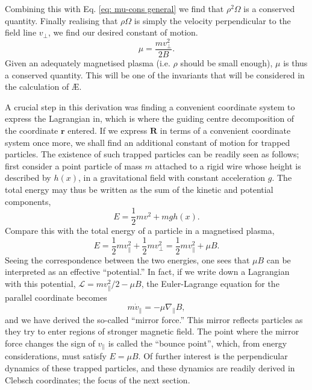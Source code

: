 Combining this with Eq. \eqref{eq: mu-cons general} we find that $\rho^2 \Omega$ is a conserved quantity. Finally realising that $\rho \Omega$ is simply the velocity perpendicular to the field line $v_\perp$, we find our desired constant of motion.
\begin{equation}
    \mu = \frac{m v_\perp^2}{2B}.
\end{equation}
Given an adequately magnetised plasma (i.e. $\rho$ should be small enough), $\mu$ is thus a conserved quantity. This will be one of the invariants that will be considered in the calculation of \AE{}. \par 
A crucial step in this derivation was finding a convenient coordinate system to express the Lagrangian in, which is where the guiding centre decomposition of the coordinate $\boldsymbol{r}$ entered. If we express $\boldsymbol{R}$ in terms of a convenient coordinate system once more, we shall find an additional constant of motion for trapped particles. The existence of such trapped particles can be readily seen as follows; first consider a point particle of mass $m$ attached to a rigid wire whose height is described by $h(x)$, in a gravitational field with constant acceleration $g$. The total energy may thus be written as the sum of the kinetic and potential components,
\begin{equation}
    E = \frac{1}{2}mv^2 + mgh(x).
\end{equation}
Compare this with the total energy of a particle in a magnetised plasma,
\begin{equation}
    E = \frac{1}{2}mv_\parallel^2 + \frac{1}{2}mv_\perp^2 = \frac{1}{2}mv_\parallel^2 + \mu B.
\end{equation}
Seeing the correspondence between the two energies, one sees that $\mu B$ can be interpreted as an effective ``potential.'' In fact, if we write down a Lagrangian with this potential, $\mathcal{L} = mv_\parallel^2/2 - \mu B$, the Euler-Lagrange equation for the parallel coordinate becomes
\begin{equation}
    m \dot{v}_\parallel = - \mu \nabla_\parallel B,
\end{equation}
and we have derived the so-called ``mirror force.'' This mirror reflects particles as they try to enter regions of stronger magnetic field. The point where the mirror force changes the sign of $v_\parallel$ is called the ``bounce point'', which, from energy considerations, must satisfy $E = \mu B$. Of further interest is the perpendicular dynamics of these trapped particles, and these dynamics are readily derived in Clebsch coordinates; the focus of the next section.

